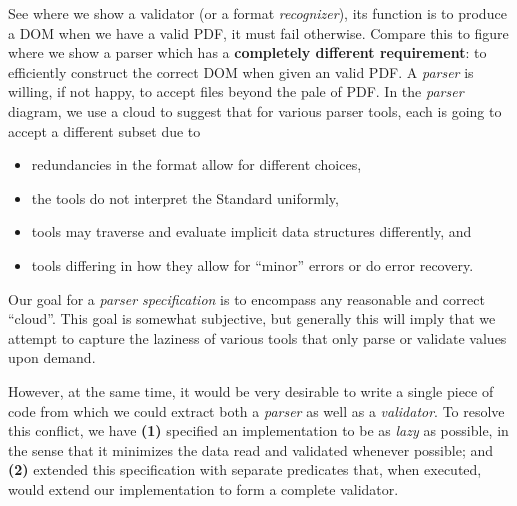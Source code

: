 See  where we show a validator (or a format \emph{recognizer}),
its function is to produce a DOM when we have a valid PDF, it must fail
otherwise.  Compare this to figure  where we show a parser
which has a {\bf{completely different requirement}}: to efficiently construct
the correct DOM when given an valid PDF.  A \emph{parser} is willing, if not
happy, to accept files beyond the pale of PDF.
In the \emph{parser} diagram,
we use a cloud to suggest that for various parser tools,
each is going to accept a different subset due to
\begin{itemize}
\item redundancies in the format allow for different choices,
\item the tools do not interpret the Standard uniformly,
\item tools may traverse and evaluate implicit data structures differently, and
\item tools differing in how they allow for ``minor'' errors or do error recovery.
\end{itemize}
Our goal for a \emph{parser specification} is to encompass any reasonable and
correct ``cloud''.  This goal is somewhat subjective, but generally this will
imply that we attempt to capture the laziness of various tools that only parse
or validate values upon demand.

% 

However, at the same time, it would be very desirable to
write a single piece of code from which we could extract
both a \emph{parser} as well as a \emph{validator}.
To resolve this conflict, we have %
\textbf{(1)} specified an implementation to be as \emph{lazy} as possible, in the sense that it minimizes the data read and validated whenever possible; and %
\textbf{(2)} extended this specification
with separate  predicates that, when executed,
would extend our implementation to form a complete validator.

